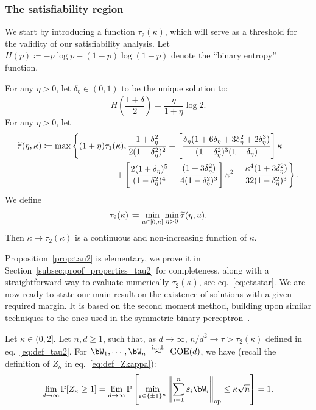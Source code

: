 \subsubsection{The satisfiability region}

We start by introducing a function $\tau_2(\kappa)$, which will serve as a threshold for the validity of our satisfiability analysis.
Let $H(p) \coloneqq - p \log p - (1-p)\log (1-p)$ denote the ``binary entropy'' function.
\begin{proposition}\label{prop:tau2}
   For any $\eta > 0$, let $\delta_\eta \in (0,1)$ to be the unique solution to:
    \begin{equation}
        \label{eq:def_delta_eta}
        H\left(\frac{1+\delta}{2}\right) = \frac{\eta}{1+\eta} \log 2.  
    \end{equation}
    For any $\eta > 0$, let 
\begin{align}
    \nonumber
        \label{eq:def_ttau}
        \ttau(\eta,\kappa) &\coloneqq \max\left\{(1+\eta) \tau_1(\kappa), 
\frac{1+\delta_\eta^2}{2(1-\delta_\eta^2)^2}
    + \left[\frac{\delta_\eta(1+6\delta_\eta+3\delta_\eta^2+2\delta_\eta^3)}{(1-\delta_\eta^2)^3(1-\delta_\eta)}\right] \kappa \right.\\
    &
    \left.
     \hspace{3cm} + \left[ \frac{2(1+\delta_\eta)^5}{(1-\delta_\eta^2)^4} - \frac{(1+3 \delta_\eta^2)}{4(1-\delta_\eta^2)^3}\right] \kappa^2 
      + \frac{\kappa^4(1+3\delta_\eta^2)}{32(1-\delta_\eta^2)^3}
\right\}.
\end{align}
    We define
    \begin{equation}
        \label{eq:def_tau2}
        \tau_2(\kappa) \coloneqq \min_{u \in [0,\kappa]} \min_{\eta > 0} {\widetilde{\tau}}(\eta, u).
    \end{equation}
    Then $\kappa \mapsto \tau_2(\kappa)$ is a continuous and non-increasing function of $\kappa$.
\end{proposition}
\noindent
Proposition~\ref{prop:tau2} is elementary, we prove it in Section~\ref{subsec:proof_properties_tau2} for completeness, along 
with a straightforward way to evaluate numerically $\tau_2(\kappa)$, see eq.~\eqref{eq:etastar}.
We are now ready to state our main result on the existence of solutions with a given required margin.
It is based on the second moment method, building upon similar techniques to the ones used in the symmetric binary perceptron~\citep{aubin2019storage}.
\begin{theorem}\label{thm:second_moment}
    Let $\kappa \in (0, 2]$. 
    Let $n,d \geq 1$, such that, as $d \to \infty$, $n/d^2 \to \tau > \tau_2(\kappa)$ defined in eq.~\eqref{eq:def_tau2}. 
    For $\bW_1, \cdots, \bW_n~\iid~\GOE(d)$, we have (recall the definition of $Z_\kappa$ in eq.~\eqref{eq:def_Zkappa}):
    \begin{equation*}
        \lim_{d \to \infty} \bbP[Z_\kappa \geq 1] = \lim_{d \to \infty} \bbP\left[\min_{\eps \in \{\pm 1\}^n} \left\|\sum_{i=1}^n \eps_i \bW_i \right\|_\op \leq \kappa \sqrt{n}\right] = 1.
    \end{equation*} 
\end{theorem}
